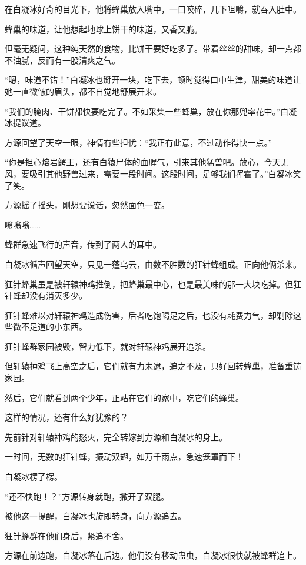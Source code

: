 \begin{this_body}
在白凝冰好奇的目光下，他将蜂巢放入嘴中，一口咬碎，几下咀嚼，就吞入肚中。

蜂巢的味道，让他想起地球上饼干的味道，又香又脆。

但毫无疑问，这种纯天然的食物，比饼干要好吃多了。带着丝丝的甜味，却一点都不油腻，反而有一股清爽之气。

“嗯，味道不错！”白凝冰也掰开一块，吃下去，顿时觉得口中生津，甜美的味道让她一直微皱的眉头，都不自觉地舒展开来。

“我们的腌肉、干饼都快要吃完了。不如采集一些蜂巢，放在你那兜率花中。”白凝冰提议道。

方源回望了天空一眼，神情有些担忧：“我正有此意，不过动作得快一点。”

“你是担心熔岩鳄王，还有白猿尸体的血腥气，引来其他猛兽吧。放心，今天无风，要吸引其他野兽过来，需要一段时间。这段时间，足够我们挥霍了。”白凝冰笑了笑。

方源摇了摇头，刚想要说话，忽然面色一变。

嗡嗡嗡……

蜂群急速飞行的声音，传到了两人的耳中。

白凝冰循声回望天空，只见一蓬乌云，由数不胜数的狂针蜂组成。正向他俩杀来。

狂针蜂巢虽是被轩辕神鸡推倒，把蜂巢最中心，也是最美味的那一大块吃掉。但狂针蜂却没有消灭多少。

狂针蜂难以对轩辕神鸡造成伤害，后者吃饱喝足之后，也没有耗费力气，却剿除这些微不足道的小东西。

狂针蜂群家园被毁，智力低下，就对轩辕神鸡展开追杀。

但轩辕神鸡飞上高空之后，它们就有力未逮，追之不及，只好回转蜂巢，准备重铸家园。

然后，它们就看到两个少年，正站在它们的家中，吃它们的蜂巢。

这样的情况，还有什么好犹豫的？

先前针对轩辕神鸡的怒火，完全转嫁到方源和白凝冰的身上。

一时间，无数的狂针蜂，振动双翅，如万千雨点，急速笼罩而下！

白凝冰楞了楞。

“还不快跑！？”方源转身就跑，撒开了双腿。

被他这一提醒，白凝冰也旋即转身，向方源追去。

狂针蜂群在他们身后，紧追不舍。

方源在前边跑，白凝冰落在后边。他们没有移动蛊虫，白凝冰很快就被蜂群追上。


\end{this_body}
